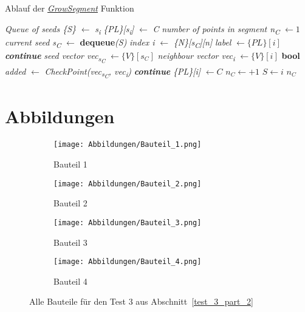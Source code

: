 \begin{algorithm}
	\caption{Ablauf der \textit{\hyperref[alg:grow_segment]{GrowSegment}} Funktion}
	\label{alg:grow_segment}
	\begin{algorithmic}[1]
		\State \textit{Queue of seeds \{S\}} $\gets$ \textit{s\textsubscript{i}}
		\State \textit{\{PL\}[s\textsubscript{i}]} $\gets$ \textit{C}
		\State \textit{number of points in segment n\textsubscript{C}} $\gets 1$
		\State \textit{current seed s\textsubscript{C}} $\gets$ \textbf{dequeue}\textit{(S)}
		\State \textit{index i} $\gets$ \textit{\{N\}[s\textsubscript{C}][n]}
		\State \textit{label} $\gets \{PL\}[i]$ 
		\State \textit{\textbf{continue}}
		\EndIf
		\State \textit{seed vector vec\textsubscript{s\textsubscript{C}}} $\gets \{V\}[s_C]$
		\State \textit{neighbour vector vec\textsubscript{i}} $\gets \{V\}[i]$
		\State \textbf{bool }\textit{added} $\gets$ \textit{CheckPoint(vec\textsubscript{s\textsubscript{C}}, vec\textsubscript{i})}
		\State \textit{\textbf{continue}}
		\EndIf
		\State \textit{\{PL\}[i]} $\gets C$
		\State $n_C \gets +1$
		\State $S \gets i$
		\EndFor
		\EndWhile
		\State \Return $n_C$
		\EndFunction
	\end{algorithmic}
\end{algorithm}

\chapter{Abbildungen} \label{Bilder}
\begin{figure}[h]
	\centering
	\begin{subfigure}{0.49\textwidth}
		\texttt{[image: Abbildungen/Bauteil\_1.png]}
		\centering
		\caption{Bauteil 1}
		\label{fig:bauteil_1}
	\end{subfigure}
	\hfill
	\begin{subfigure}{0.49\textwidth}
		\texttt{[image: Abbildungen/Bauteil\_2.png]}
		\centering
		\caption{Bauteil 2}
		\label{fig:bauteil_2}
	\end{subfigure}
	\vfill
		\begin{subfigure}{0.49\textwidth}
		\texttt{[image: Abbildungen/Bauteil\_3.png]}
		\centering
		\caption{Bauteil 3}
		\label{fig:bauteil_3}
	\end{subfigure}
	\hfill
	\begin{subfigure}{0.49\textwidth}
		\texttt{[image: Abbildungen/Bauteil\_4.png]}
		\centering
		\caption{Bauteil 4}
		\label{fig:bauteil_4}
	\end{subfigure}
\caption{Alle Bauteile für den Test 3 aus Abschnitt~\ref{test_3_part_2}}
\label{fig:bauteile_test_3_2}
\end{figure}

